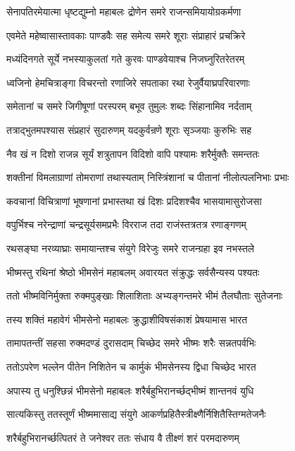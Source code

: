 \twolineshloka
{सेनापतिरमेयात्मा धृष्टद्युम्नो महाबलः}
{द्रोणेन समरे राजन्समियायोग्रकर्मणा}


\twolineshloka
{एवमेते महेष्वासास्तावकाः पाण्डवैः सह}
{समेत्य समरे शूराः संप्राहारं प्रचक्रिरे}


\twolineshloka
{मध्यंदिनगते सूर्ये नभस्याकुलतां गते}
{कुरवः पाण्डवेयाश्च निजघ्नुरितरेतरम्}


\twolineshloka
{ध्वजिनो हेमचित्राङ्गा विचरन्तो रणाजिरे}
{सपताका रथा रेजुर्वैयाघ्रपरिवारणाः}


\twolineshloka
{समेतानां च समरे जिगीषूणां परस्परम्}
{बभूव तुमुलः शब्दः सिंहानामिव नर्दताम्}


\twolineshloka
{तत्राद्भुतमपश्यास संप्रहारं सुदारुणम्}
{यदकुर्वन्रणे शूराः सृञ्जयाः कुरुभिः सह}


\twolineshloka
{नैव खं न दिशो राजन्न सूर्यं शत्रुतापन}
{विदिशो वापि पश्यामः शरैर्मुक्तैः समन्ततः}


\twolineshloka
{शक्तीनां विमलाग्राणां तोमराणां तथास्यताम्}
{निस्त्रिंशानां च पीतानां नीलोत्पलनिभाः प्रभाः}


\twolineshloka
{कवचानां विचित्राणां भूषणानां प्रभास्तथा}
{खं दिशः प्रदिशश्चैव भासयामासुरोजसा}


\twolineshloka
{वपुर्भिश्च नरेन्द्राणां चन्द्रसूर्यसमप्रभैः}
{विरराज तदा राजंस्तत्रतत्र रणाङ्गणम्}


\twolineshloka
{रथसङ्घा नरव्याघ्राः समायान्तश्च संयुगे}
{विरेजुः समरे राजन्ग्रहा इव नभस्तले}


\twolineshloka
{भीष्मस्तु रथिनां श्रेष्ठो भीमसेनं महाबलम्}
{अवारयत संक्रुद्धः सर्वसैन्यस्य पश्यतः}


\twolineshloka
{ततो भीष्मविनिर्मुक्ता रुक्मपुङ्खाः शिलाशिताः}
{अभ्यङ्गन्तमरे भीमं तैलघौताः सुतेजनाः}


\twolineshloka
{तस्य शक्तिं महावेगं भीमसेनो महाबलः}
{क्रुद्धाशीविषसंकाशं प्रेषयामास भारत}


\twolineshloka
{तामापतन्तीं सहसा रुक्मदण्डं दुरासदाम्}
{चिच्छेद समरे भीष्मः शरैः सन्नतपर्वभिः}


\twolineshloka
{ततोऽपरेण भल्लेन पीतेन निशितेन च}
{कार्मुकं भीमसेनस्य द्विधा चिच्छेद भारत}


\twolineshloka
{अपास्य तु धनुश्छिन्नं भीमसेनो महाबलः}
{शरैर्बहुभिरानर्च्छद्भीष्मं शान्तनवं युधि}


\twolineshloka
{सात्यकिस्तु ततस्तूर्णं भीष्ममासाद्य संयुगे}
{आकर्णप्रहितैस्त्रीक्ष्णैर्निशितैस्तिग्मतेजनैः}


\twolineshloka
{शरैर्बहुभिरानर्च्छत्पितरं ते जनेश्वर}
{ततः संधाय वै तीक्ष्णं शरं परमदारुणम्}



